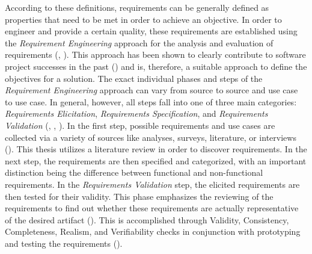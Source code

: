 According to these definitions, requirements can be generally defined as properties that need to be met in order to achieve an objective. In order to engineer and provide a certain quality, these requirements are established using the \textit{Requirement Engineering} approach for the analysis and evaluation of requirements (\cite{SWEBOK.2004}, \cite{Sommerville.2011}). This approach has been shown to clearly contribute to software project successes in the past (\cite{Hofmann.2001}) and is, therefore, a suitable approach to define the objectives for a solution. The exact individual phases and steps of the \textit{Requirement Engineering} approach can vary from source to source and use case to use case. In general, however, all steps fall into one of three main categories: \textit{Requirements Elicitation}, \textit{Requirements Specification}, and \textit{Requirements Validation} (\cite{SWEBOK.2004}, \cite{Sommerville.2011}, \cite{Fernandes.2009}). In the first step, possible requirements and use cases are collected via a variety of sources like analyses, surveys, literature, or interviews (\cite{Sommerville.2011}). This thesis utilizes a literature review in order to discover requirements. In the next step, the requirements are then specified and categorized, with an important distinction being the difference between functional and non-functional requirements. In the \textit{Requirements Validation} step, the elicited requirements are then tested for their validity. This phase emphasizes the reviewing of the requirements to find out whether these requirements are actually representative of the desired artifact (\cite{Sommerville.2011}). This is accomplished through Validity, Consistency, Completeness, Realism, and Verifiability checks in conjunction with prototyping and testing the requirements (\cite{Sommerville.2011}).



